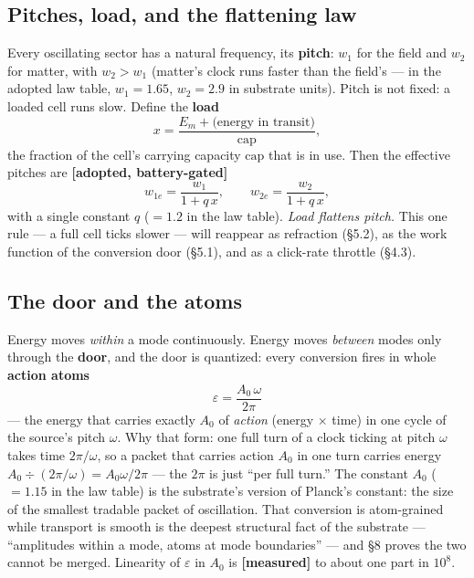 \subsection{Pitches, load, and the flattening
law}\label{pitches-load-and-the-flattening-law}

Every oscillating sector has a natural frequency, its \textbf{pitch}:
\(w_1\) for the field and \(w_2\) for matter, with \(w_2 > w_1\)
(matter's clock runs faster than the field's --- in the adopted law
table, \(w_1 = 1.65\), \(w_2 = 2.9\) in substrate units). Pitch is not
fixed: a loaded cell runs slow. Define the \textbf{load}
\[x = \frac{E_m + \text{(energy in transit)}}{\mathrm{cap}},\] the
fraction of the cell's carrying capacity \(\mathrm{cap}\) that is in
use. Then the effective pitches are \textbf{{[}adopted,
battery-gated{]}} \[w_{1e} = \frac{w_1}{1 + q\,x}, \qquad
  w_{2e} = \frac{w_2}{1 + q\,x},\] with a single constant \(q\)
(\(=1.2\) in the law table). \emph{Load flattens pitch.} This one rule
--- a full cell ticks slower --- will reappear as refraction (§5.2), as
the work function of the conversion door (§5.1), and as a click-rate
throttle (§4.3).

\subsection{The door and the atoms}\label{the-door-and-the-atoms}

Energy moves \emph{within} a mode continuously. Energy moves
\emph{between} modes only through the \textbf{door}, and the door is
quantized: every conversion fires in whole \textbf{action atoms}
\[\boxed{\;\varepsilon = \frac{A_0\,\omega}{2\pi}\;}\] --- the energy
that carries exactly \(A_0\) of \emph{action} (energy \(\times\) time)
in one cycle of the source's pitch \(\omega\). Why that form: one full
turn of a clock ticking at pitch \(\omega\) takes time \(2\pi/\omega\),
so a packet that carries action \(A_0\) in one turn carries energy
\(A_0 \div (2\pi/\omega) = A_0\omega/2\pi\) --- the \(2\pi\) is just
``per full turn.'' The constant \(A_0\) (\(=1.15\) in the law table) is
the substrate's version of Planck's constant: the size of the smallest
tradable packet of oscillation. That conversion is atom-grained while
transport is smooth is the deepest structural fact of the substrate ---
``amplitudes within a mode, atoms at mode boundaries'' --- and §8 proves
the two cannot be merged. Linearity of \(\varepsilon\) in \(A_0\) is
\textbf{{[}measured{]}} to about one part in \(10^{8}\).

